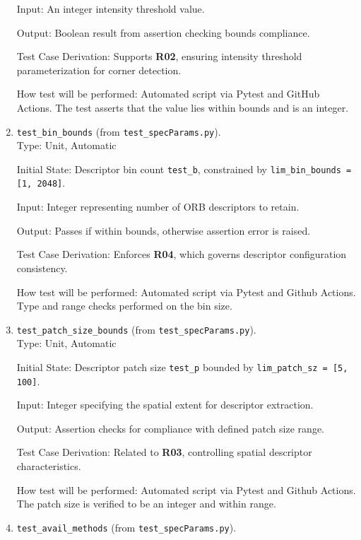 \documentclass[12pt, titlepage]{article}
\begin{document}
\begin{enumerate}
  Input: An integer intensity threshold value.

  Output: Boolean result from assertion checking bounds compliance.

  Test Case Derivation: Supports \textbf{R02}, ensuring intensity threshold parameterization for corner detection.

  How test will be performed: Automated script via Pytest and GitHub Actions. The test asserts that the value lies within bounds and is an integer.

  \item \texttt{test\_bin\_bounds} \textnormal{(from \texttt{test\_specParams.py})}. \\

  Type: Unit, Automatic

  Initial State: Descriptor bin count \texttt{test\_b}, constrained by \texttt{lim\_bin\_bounds = [1, 2048]}.

  Input: Integer representing number of ORB descriptors to retain.

  Output: Passes if within bounds, otherwise assertion error is raised.

  Test Case Derivation: Enforces \textbf{R04}, which governs descriptor configuration consistency.

  How test will be performed: Automated script via Pytest and Github Actions. Type and range checks performed on the bin size.

  \item \texttt{test\_patch\_size\_bounds} \textnormal{(from \texttt{test\_specParams.py})}. \\

  Type: Unit, Automatic

  Initial State: Descriptor patch size \texttt{test\_p} bounded by \texttt{lim\_patch\_sz = [5, 100]}.

  Input: Integer specifying the spatial extent for descriptor extraction.

  Output: Assertion checks for compliance with defined patch size range.

  Test Case Derivation: Related to \textbf{R03}, controlling spatial descriptor characteristics.

  How test will be performed: Automated script via Pytest and Github Actions. The patch size is verified to be an integer and within range.

  \item \texttt{test\_avail\_methods} \textnormal{(from \texttt{test\_specParams.py})}. \\


\end{enumerate}
\end{document}
